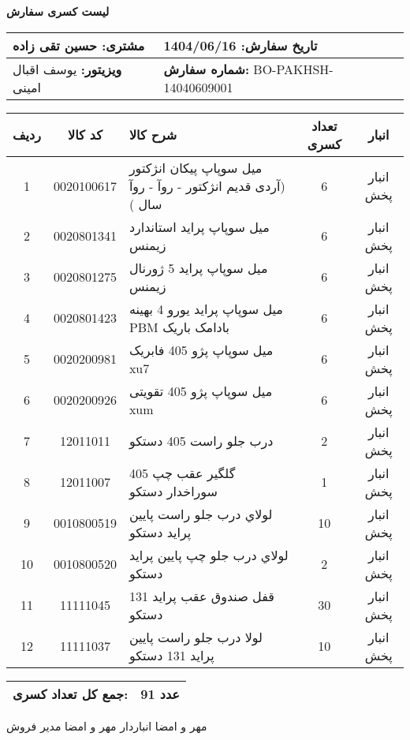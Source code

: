 \documentclass[a4paper,12pt]{article}
\begin{document}
\begin{center}
    {\Huge \textbf{   لیست کسری سفارش   }} \\
\end{center}

\vspace{0.5cm}

\noindent
\begin{tabular}{|p{7cm}|p{7cm}|}
\hline
\textbf{مشتری:} حسین تقی زاده & \textbf{تاریخ سفارش:} 1404/06/16 \\
\hline
\textbf{ویزیتور:} یوسف اقبال امینی & \textbf{شماره سفارش:} BO-PAKHSH-14040609001 \\
\hline
\end{tabular}

\vspace{0.5cm}

\begin{longtable}{|c|c|p{6cm}|c|c|}
\hline
\rowcolor{headerblue} \color{white}
\textbf{ردیف} &  \textbf{کد کالا} & \textbf{شرح کالا} & \textbf{تعداد کسری} & \textbf{انبار} \\
\hline
\endhead
1 & 0020100617 & میل سوپاپ پیکان انژکتور (آردی قدیم انژکتور - روآ - روآ سال ) & 6 & انبار پخش \\
\hline
2 & 0020801341 & میل سوپاپ پراید استاندارد زیمنس & 6 & انبار پخش \\
\hline
3 & 0020801275 & میل سوپاپ پراید 5 ژورنال زیمنس & 6 & انبار پخش \\
\hline
4 & 0020801423 & ميل سوپاپ پرايد يورو 4 بهينه PBM بادامک باريک & 6 & انبار پخش \\
\hline
5 & 0020200981 & میل سوپاپ پژو 405 فابریک xu7 & 6 & انبار پخش \\
\hline
6 & 0020200926 & میل سوپاپ پژو 405 تقویتی xum & 6 & انبار پخش \\
\hline
7 & 12011011 & درب جلو راست 405 دستکو & 2 & انبار پخش \\
\hline
8 & 12011007 & گلگير عقب چپ 405 سوراخدار دستکو & 1 & انبار پخش \\
\hline
9 & 0010800519 & لولاي درب جلو راست پايين پرايد دستکو & 10 & انبار پخش \\
\hline
10 & 0010800520 & لولاي درب جلو چپ پايين پرايد دستکو & 2 & انبار پخش \\
\hline
11 & 11111045 & قفل صندوق عقب پرايد 131 دستکو & 30 & انبار پخش \\
\hline
12 & 11111037 & لولا درب جلو راست پايين پرايد 131 دستکو & 10 & انبار پخش \\
\hline

\end{longtable}

\vspace{0.3cm}
\noindent
\begin{tabular}{|p{7cm}|p{7cm}|}
\hline
\textbf{جمع کل تعداد کسری:} & 91 عدد \\
\hline
\end{tabular}

\vspace{1.5cm}

\noindent
مهر و امضا انباردار \hspace{8cm} مهر و امضا مدیر فروش
\end{document}
